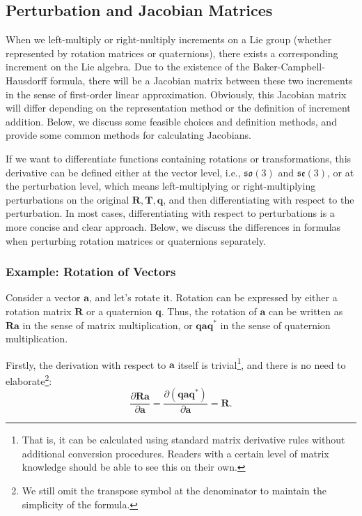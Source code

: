 \subsection{Perturbation and Jacobian Matrices}
When we left-multiply or right-multiply increments on a Lie group (whether represented by rotation matrices or quaternions), there exists a corresponding increment on the Lie algebra. Due to the existence of the Baker-Campbell-Hausdorff formula, there will be a Jacobian matrix between these two increments in the sense of first-order linear approximation. Obviously, this Jacobian matrix will differ depending on the representation method or the definition of increment addition. Below, we discuss some feasible choices and definition methods, and provide some common methods for calculating Jacobians.

If we want to differentiate functions containing rotations or transformations, this derivative can be defined either at the vector level, i.e., $\mathfrak{so}(3)$ and $\mathfrak{se}(3)$, or at the perturbation level, which means left-multiplying or right-multiplying perturbations on the original $\mathbf{R}, \mathbf{T}, \mathbf{q}$, and then differentiating with respect to the perturbation. In most cases, differentiating with respect to perturbations is a more concise and clear approach. Below, we discuss the differences in formulas when perturbing rotation matrices or quaternions separately.

\subsubsection{Example: Rotation of Vectors}
Consider a vector $\mathbf{a}$, and let's rotate it. Rotation can be expressed by either a rotation matrix $\mathbf{R}$ or a quaternion $\mathbf{q}$. Thus, the rotation of $\mathbf{a}$ can be written as $\mathbf{R}\mathbf{a}$ in the sense of matrix multiplication, or $\mathbf{q} \mathbf{a} \mathbf{q}^*$ in the sense of quaternion multiplication.

Firstly, the derivation with respect to $\mathbf{a}$ itself is trivial\footnote{That is, it can be calculated using standard matrix derivative rules without additional conversion procedures. Readers with a certain level of matrix knowledge should be able to see this on their own.}, and there is no need to elaborate\footnote{We still omit the transpose symbol at the denominator to maintain the simplicity of the formula.}:
\begin{equation}\label{key}
	\frac{{\partial \mathbf{R} \mathbf{a}}}{{\partial \mathbf{a}}} = \frac{{\partial \left( \mathbf{q} \mathbf{a} {\mathbf{q}^*} 
			\right)}}{{\partial \mathbf{a}}} = \mathbf{R}.
\end{equation}

